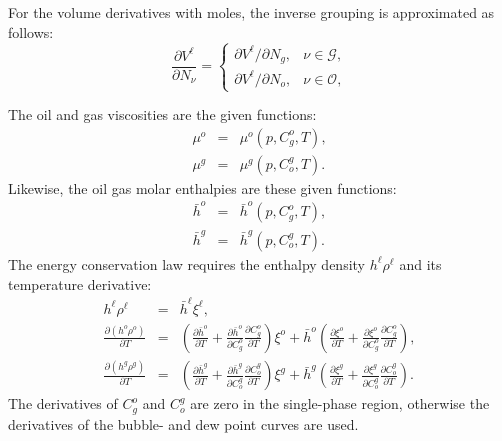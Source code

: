 For the volume derivatives with moles, the inverse grouping is
approximated as follows:
\begin{equation}
  \frac{\partial V^\ell}{\partial N_\nu} = \left\{
    \begin{array}{ll}
      \partial V^\ell / \partial N_g, & \nu\in\mathcal{G}, \\
      \partial V^\ell / \partial N_o, & \nu\in\mathcal{O},
    \end{array}
  \right.
\end{equation}



The oil and gas viscosities are the given functions:
\begin{eqnarray}
  \mu^o & = & \mu^o\left(p,C_g^o,T\right), \\
  \mu^g & = & \mu^g\left(p,C_o^g,T\right).
\end{eqnarray}
Likewise, the oil gas molar enthalpies are these given functions:
\begin{eqnarray}
  \bar h^o & = & \bar h^o\left(p,C_g^o,T\right), \\
  \bar h^g & = & \bar h^g\left(p,C_o^g,T\right).
\end{eqnarray}
The energy conservation law requires the enthalpy density $h^\ell
\rho^\ell$ and its temperature derivative:
\begin{eqnarray}
  h^\ell \rho^\ell & = & \bar h^\ell \xi^\ell, \\
  \frac{\partial\left(h^o \rho^o\right)}{\partial T} & = &
  \left(
    \frac{\partial \bar h^o}{\partial T} +
    \frac{\partial \bar h^o}{\partial C_g^o}
    \frac{\partial C_g^o}{\partial T}
  \right) \xi^o +
  \bar h^o \left(
    \frac{\partial \xi^o}{\partial T} +
    \frac{\partial \xi^o}{\partial C_g^o}
    \frac{\partial C_g^o}{\partial T}
  \right), \\
  \frac{\partial\left(h^g \rho^g\right)}{\partial T} & = &
  \left(
    \frac{\partial \bar h^g}{\partial T} +
    \frac{\partial \bar h^g}{\partial C_o^g}
    \frac{\partial C_o^g}{\partial T}
  \right) \xi^g +
  \bar h^g \left(
    \frac{\partial \xi^g}{\partial T} +
    \frac{\partial \xi^g}{\partial C_o^g}
    \frac{\partial C_o^g}{\partial T}
  \right).
\end{eqnarray}
The derivatives of $C_g^o$ and $C_o^g$ are zero in the single-phase
region, otherwise the derivatives of the bubble- and dew point curves
are used.

